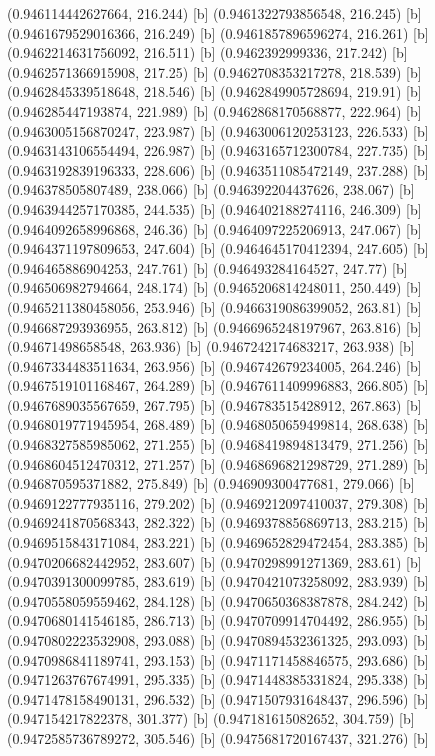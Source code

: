 {{{(0.946114442627664, 216.244) [b] 
(0.9461322793856548, 216.245) [b] 
(0.9461679529016366, 216.249) [b] 
(0.9461857896596274, 216.261) [b] 
(0.9462214631756092, 216.511) [b] 
(0.9462392999336, 217.242) [b] 
(0.9462571366915908, 217.25) [b] 
(0.9462708353217278, 218.539) [b] 
(0.9462845339518648, 218.546) [b] 
(0.9462849905728694, 219.91) [b] 
(0.946285447193874, 221.989) [b] 
(0.9462868170568877, 222.964) [b] 
(0.9463005156870247, 223.987) [b] 
(0.9463006120253123, 226.533) [b] 
(0.9463143106554494, 226.987) [b] 
(0.9463165712300784, 227.735) [b] 
(0.9463192839196333, 228.606) [b] 
(0.9463511085472149, 237.288) [b] 
(0.946378505807489, 238.066) [b] 
(0.946392204437626, 238.067) [b] 
(0.9463944257170385, 244.535) [b] 
(0.946402188274116, 246.309) [b] 
(0.9464092658996868, 246.36) [b] 
(0.9464097225206913, 247.067) [b] 
(0.9464371197809653, 247.604) [b] 
(0.9464645170412394, 247.605) [b] 
(0.946465886904253, 247.761) [b] 
(0.946493284164527, 247.77) [b] 
(0.946506982794664, 248.174) [b] 
(0.9465206814248011, 250.449) [b] 
(0.9465211380458056, 253.946) [b] 
(0.9466319086399052, 263.81) [b] 
(0.946687293936955, 263.812) [b] 
(0.9466965248197967, 263.816) [b] 
(0.94671498658548, 263.936) [b] 
(0.9467242174683217, 263.938) [b] 
(0.9467334483511634, 263.956) [b] 
(0.946742679234005, 264.246) [b] 
(0.9467519101168467, 264.289) [b] 
(0.9467611409996883, 266.805) [b] 
(0.9467689035567659, 267.795) [b] 
(0.946783515428912, 267.863) [b] 
(0.9468019771945954, 268.489) [b] 
(0.9468050659499814, 268.638) [b] 
(0.9468327585985062, 271.255) [b] 
(0.9468419894813479, 271.256) [b] 
(0.9468604512470312, 271.257) [b] 
(0.9468696821298729, 271.289) [b] 
(0.946870595371882, 275.849) [b] 
(0.946909300477681, 279.066) [b] 
(0.9469122777935116, 279.202) [b] 
(0.9469212097410037, 279.308) [b] 
(0.9469241870568343, 282.322) [b] 
(0.9469378856869713, 283.215) [b] 
(0.9469515843171084, 283.221) [b] 
(0.9469652829472454, 283.385) [b] 
(0.9470206682442952, 283.607) [b] 
(0.9470298991271369, 283.61) [b] 
(0.9470391300099785, 283.619) [b] 
(0.9470421073258092, 283.939) [b] 
(0.9470558059559462, 284.128) [b] 
(0.9470650368387878, 284.242) [b] 
(0.9470680141546185, 286.713) [b] 
(0.9470709914704492, 286.955) [b] 
(0.9470802223532908, 293.088) [b] 
(0.9470894532361325, 293.093) [b] 
(0.9470986841189741, 293.153) [b] 
(0.9471171458846575, 293.686) [b] 
(0.9471263767674991, 295.335) [b] 
(0.9471448385331824, 295.338) [b] 
(0.9471478158490131, 296.532) [b] 
(0.9471507931648437, 296.596) [b] 
(0.947154217822378, 301.377) [b] 
(0.947181615082652, 304.759) [b] 
(0.9472585736789272, 305.546) [b] 
(0.9475681720167437, 321.276) [b] 
}}}
